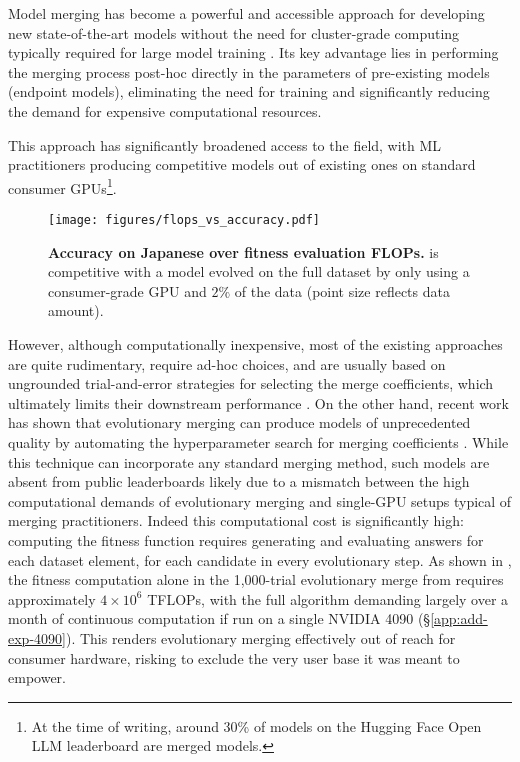 
Model merging has become a powerful and accessible approach for developing new state-of-the-art models without the need for cluster-grade computing typically required for large model training \cite{yang2024model}.
Its key advantage lies in performing the merging process post-hoc directly in the parameters of pre-existing models (endpoint models), eliminating the need for training and significantly reducing the demand for expensive computational resources.

This approach has significantly broadened access to the field, with ML practitioners producing competitive models out of existing ones on standard consumer GPUs\footnote{At the time of writing, around 30\% of models on the Hugging Face Open LLM leaderboard are merged models.}\citep{task-vectors}.
%
\begin{figure}[t]
    \centering
    \texttt{[image: figures/flops\_vs\_accuracy.pdf]}
    \caption{\textbf{Accuracy on Japanese  over fitness evaluation FLOPs.} \approach{} is competitive with a model evolved on the full dataset by only using a consumer-grade GPU and $2\%$ of the data (point size reflects data amount).}
    \label{fig:speed_accuracy}
\end{figure}
%
However, although computationally inexpensive, most of the existing approaches are quite rudimentary, require ad-hoc choices, and are usually based on ungrounded trial-and-error strategies for selecting the merge coefficients, which ultimately limits their downstream performance \citep{ties, yu2024language}.
On the other hand, recent work has shown that evolutionary merging can produce models of unprecedented quality by automating the hyperparameter search for merging coefficients \citep{sakana}.
While this technique can incorporate any standard merging method, such models are absent from public leaderboards likely due to a mismatch between the high computational demands of evolutionary merging and single-GPU setups typical of merging practitioners.
Indeed this computational cost is significantly high: computing the fitness function requires generating and evaluating answers for each dataset element, for each candidate in every evolutionary step. As shown in , the fitness computation alone in the 1,000-trial evolutionary merge from \citet{sakana} requires approximately $4\times10^6$ TFLOPs, with the full algorithm demanding largely over a month of continuous computation if run on a single NVIDIA 4090 (\S \ref{app:add-exp-4090}).
This renders evolutionary merging effectively out of reach for consumer hardware, risking to exclude the very user base it was meant to empower.


